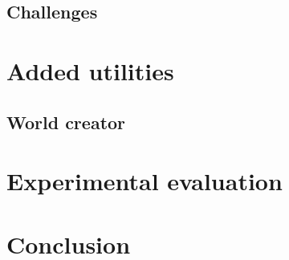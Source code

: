 \documentclass[
  digital, %
  table,   %
  oneside, %
  nolof,     %
  nolot,     %
]{fithesis3}
\begin{document}
\section{Challenges}


\chapter{Added utilities}

\section{World creator}


\chapter{Experimental evaluation}


\chapter{Conclusion}
\end{document}
